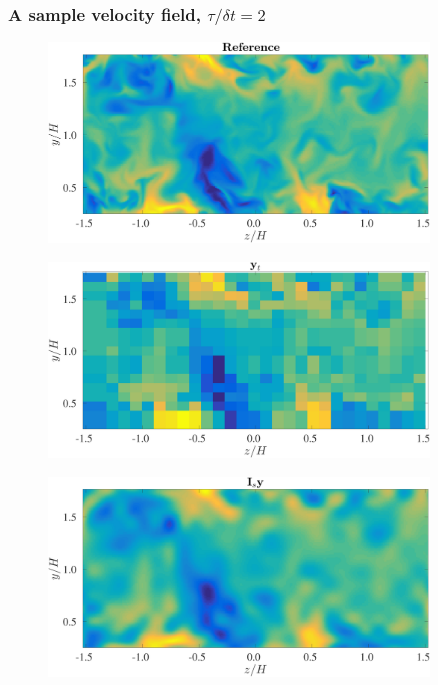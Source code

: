 \documentclass{beamer}
\begin{document}
\begin{frame}
\frametitle{A sample velocity field, $ \tau/\delta t = 2 $}
	\begin{overprint}
			\begin{figure}
				\centering
				\includegraphics[width=0.9\textwidth]{./figures/comparisons/channel/improper_outer_spacespacing_10_timespacing_10_ref_t002.png}
			\end{figure}					
			\begin{figure}
				\centering
				\includegraphics[width=0.9\textwidth]{./figures/comparisons/channel/improper_outer_spacespacing_10_timespacing_10_sub_t002.png}
			\end{figure}
			\begin{figure}
				\centering
				\includegraphics[width=0.9\textwidth]{./figures/comparisons/channel/improper_outer_spacespacing_10_timespacing_10_Isy_t002.png}

\end{figure}
\end{overprint}
\end{frame}
\end{document}
